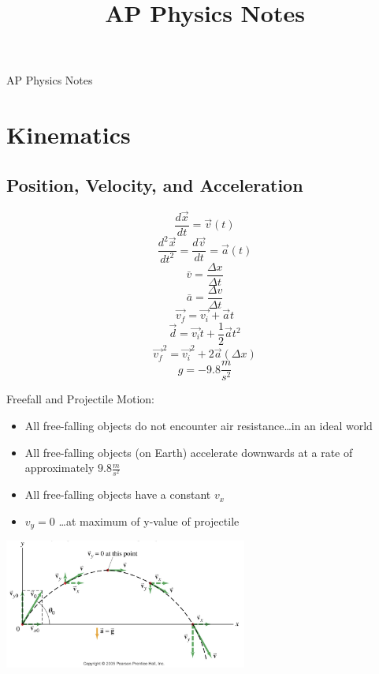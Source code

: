 \documentclass{article}
\title{AP Physics Notes}
\begin{document}
  
  \begingroup  
    \centering
    \LARGE AP Physics Notes\\[1ex]
  \endgroup
  
  \section{Kinematics}
    \subsection{Position, Velocity, and Acceleration}
    	\begin{multicols}{2}
    		\[
            	\frac{d\vec{x}}{dt}=\vec{v}(t)
            \]
    		\[
            	\frac{d^2\vec{x}}{dt^2}=\frac{d\vec{v}}{dt}=\vec{a}(t)
            \]
    		\[
            	\bar{v}=\frac{\Delta{x}}{\Delta{t}}
            \]
    		\[
            	\bar{a}=\frac{\Delta{v}}{\Delta{t}}
            \]
    		\[
            	\vec{v_f}=\vec{v_i}+\vec{a}t
            \]
    		\[
            	\vec{d}=\vec{v_i}t+\frac{1}{2}\vec{a}t^2
            \]
    		\[
            	\vec{v_f}^2=\vec{v_i}^2+2\vec{a}(\Delta{x})
            \]
    		\[
            	g=-9.8\frac{m}{s^2}
            \]
    
    		\columnbreak
    
    		Freefall and Projectile Motion:
    		\vspace{3mm}
    		\begin{itemize}
    			\item All free-falling objects do not encounter air resistance\ldots in an ideal world
    			\item All free-falling objects (on Earth) accelerate downwards at a rate of approximately $9.8\frac{m}{s^2}$
    			\item All free-falling objects have a constant $v_x$
    			\item $v_y=0$ \ldots at maximum of y-value of projectile
    		\end{itemize}
    
    		\vspace{2ex}
    		\includegraphics[width=8cm]{ProjectileMotion.jpg}
    	\end{multicols}
\end{document}
